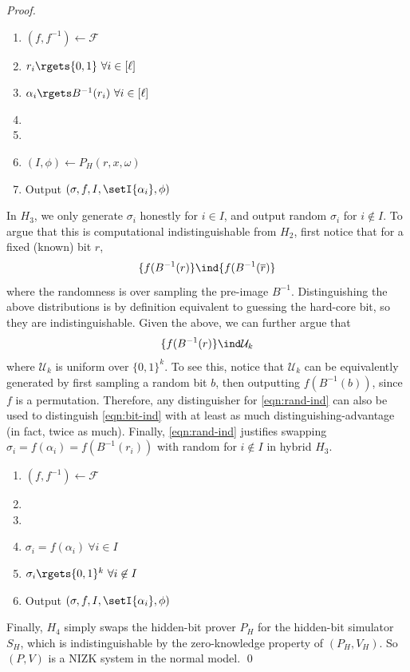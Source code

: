 \documentclass[12pt]{tufte-book}
\begin{document}
\begin{proof}
\begin{enumerate}
    \item $(f, f^{-1}) \gets \mathcal{F}$
    \item $r_i \rgets \{0, 1\} ~\forall i \in [\ell]$
    \item $\alpha_i \rgets B^{-1}(r_i) ~\forall i \in [\ell]$
    \item {}
    \item {}
    \item $(I, \phi) \gets P_H(r, x, \omega)$
    \item Output $(\sigma, f, I, \setI{\alpha_i}, \phi)$
\end{enumerate}
In $H_3$, we only generate $\sigma_i$ honestly for $i \in I$, and output random
$\sigma_i$ for $i \not\in I$.
To argue that this is computational
indistinguishable from $H_2$, first notice that for a fixed (known) bit $r$,
\begin{equation}
\label{eqn:bit-ind}
\{f(B^{-1}(r)\} \ind \{f(B^{-1}(\overline r)\}
\end{equation}
where the randomness is over sampling the pre-image $B^{-1}$.
Distinguishing the above distributions is by definition equivalent to guessing the
hard-core bit, so they are indistinguishable.
Given the above, we can further argue that
\begin{equation}
\label{eqn:rand-ind}
\{f(B^{-1}(r)\} \ind \mathcal{U}_k
\end{equation}
where $\mathcal{U}_k$ is uniform over $\{0, 1\}^k$. To see this, notice
that $\mathcal{U}_k$ can be equivalently generated by first sampling a random
bit $b$, then outputting $f(B^{-1}(b))$, since $f$ is a permutation.
Therefore, any distinguisher for \eqref{eqn:rand-ind} can also be used to distinguish
\eqref{eqn:bit-ind} with at least as much distinguishing-advantage (in fact,
twice as much).
Finally, \eqref{eqn:rand-ind} justifies swapping $\sigma_i = f(\alpha_i) =
f(B^{-1}(r_i))$ with random for $i \not\in I$ in hybrid $H_3$.





\begin{enumerate}
    \item $(f, f^{-1}) \gets \mathcal{F}$
    \item {}
    \item {}
    \item $\sigma_i = f(\alpha_i) ~\forall i \in I$
    \item $\sigma_i \rgets \{0, 1\}^k ~\forall i \not\in I$
    \item Output $(\sigma, f, I, \setI{\alpha_i}, \phi)$
\end{enumerate}
Finally, $H_4$ simply swaps the hidden-bit prover $P_H$ for the hidden-bit simulator $S_H$,
which is indistinguishable by the zero-knowledge property of $(P_H, V_H)$.
So $(P, V)$ is a NIZK system in the normal model.
\qed

\end{proof}
\end{document}
